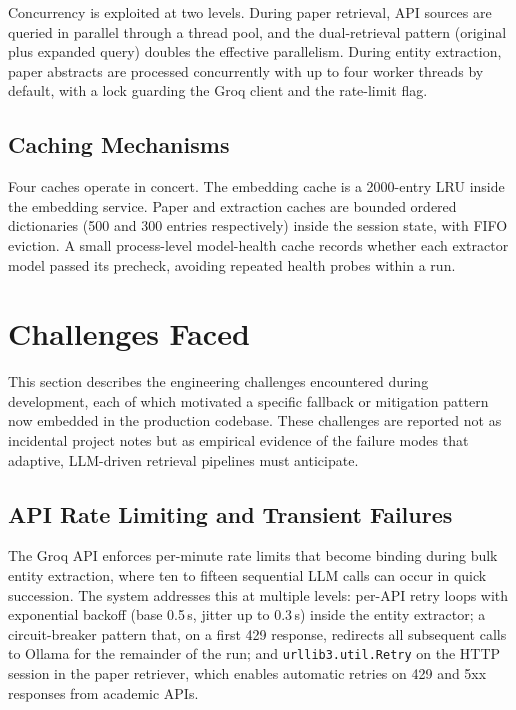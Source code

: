 \documentclass[11pt,a4paper]{article}
\begin{document}
Concurrency is exploited at two levels. During paper retrieval, API sources
are queried in parallel through a thread pool, and the dual-retrieval pattern
(original plus expanded query) doubles the effective parallelism. During
entity extraction, paper abstracts are processed concurrently with up to
four worker threads by default, with a lock guarding the Groq client and
the rate-limit flag.

\subsection{Caching Mechanisms}

Four caches operate in concert. The embedding cache is a 2000-entry LRU
inside the embedding service. Paper and extraction caches are bounded
ordered dictionaries (500 and 300 entries respectively) inside the session
state, with FIFO eviction. A small process-level model-health cache records
whether each extractor model passed its precheck, avoiding repeated health
probes within a run.

\section{Challenges Faced}

This section describes the engineering challenges encountered during
development, each of which motivated a specific fallback or mitigation
pattern now embedded in the production codebase. These challenges are
reported not as incidental project notes but as empirical evidence of the
failure modes that adaptive, LLM-driven retrieval pipelines must anticipate.

\subsection{API Rate Limiting and Transient Failures}

The Groq API enforces per-minute rate limits that become binding during bulk
entity extraction, where ten to fifteen sequential LLM calls can occur in
quick succession. The system addresses this at multiple levels: per-API retry loops
with exponential backoff (base 0.5\,s, jitter up to 0.3\,s) inside the entity
extractor; a circuit-breaker pattern that, on a first 429 response, redirects
all subsequent calls to Ollama for the remainder of the run; and
\texttt{urllib3.util.Retry} on the HTTP session in the paper retriever, which
enables automatic retries on 429 and 5xx responses from academic APIs.
\end{document}
